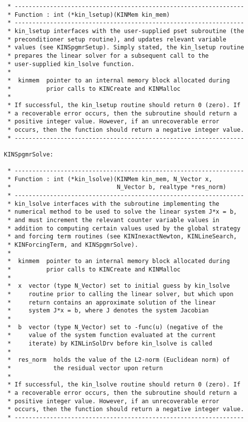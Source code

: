 \documentclass[11pt]{article}
\begin{document}
\begin{verbatim}
 * -----------------------------------------------------------------
 * Function : int (*kin_lsetup)(KINMem kin_mem)
 * -----------------------------------------------------------------
 * kin_lsetup interfaces with the user-supplied pset subroutine (the
 * preconditioner setup routine), and updates relevant variable
 * values (see KINSpgmrSetup). Simply stated, the kin_lsetup routine
 * prepares the linear solver for a subsequent call to the
 * user-supplied kin_lsolve function.
 *
 *  kinmem  pointer to an internal memory block allocated during
 *          prior calls to KINCreate and KINMalloc
 *
 * If successful, the kin_lsetup routine should return 0 (zero). If
 * a recoverable error occurs, then the subroutine should return a
 * positive integer value. However, if an unrecoverable error
 * occurs, then the function should return a negative integer value.
 * -----------------------------------------------------------------

KINSpgmrSolve:

 * -----------------------------------------------------------------
 * Function : int (*kin_lsolve)(KINMem kin_mem, N_Vector x,
 *                              N_Vector b, realtype *res_norm)
 * -----------------------------------------------------------------
 * kin_lsolve interfaces with the subroutine implementing the
 * numerical method to be used to solve the linear system J*x = b,
 * and must increment the relevant counter variable values in
 * addition to computing certain values used by the global strategy
 * and forcing term routines (see KINInexactNewton, KINLineSearch,
 * KINForcingTerm, and KINSpgmrSolve).
 *
 *  kinmem  pointer to an internal memory block allocated during
 *          prior calls to KINCreate and KINMalloc
 *
 *  x  vector (type N_Vector) set to initial guess by kin_lsolve
 *     routine prior to calling the linear solver, but which upon
 *     return contains an approximate solution of the linear
 *     system J*x = b, where J denotes the system Jacobian
 *
 *  b  vector (type N_Vector) set to -func(u) (negative of the
 *     value of the system function evaluated at the current
 *     iterate) by KINLinSolDrv before kin_lsolve is called
 *
 *  res_norm  holds the value of the L2-norm (Euclidean norm) of
 *            the residual vector upon return
 *
 * If successful, the kin_lsolve routine should return 0 (zero). If
 * a recoverable error occurs, then the subroutine should return a
 * positive integer value. However, if an unrecoverable error
 * occurs, then the function should return a negative integer value.
 * -----------------------------------------------------------------


\end{verbatim}
\end{document}
